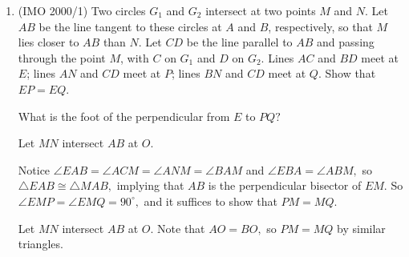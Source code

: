 \begin{enumerate}
    \item (IMO 2000/1) Two circles $G_1$ and $G_2$ intersect at two points $M$ and $N$. Let $AB$ be the line tangent to these circles at $A$ and $B$, respectively, so that $M$ lies closer to $AB$ than $N$. Let $CD$ be the line parallel to $AB$ and passing through the point $M$, with $C$ on $G_1$ and $D$ on $G_2$. Lines $AC$ and $BD$ meet at $E$; lines $AN$ and $CD$ meet at $P$; lines $BN$ and $CD$ meet at $Q$. Show that $EP=EQ$.
\begin{hint}
\begin{addhint}
{What is the foot of the perpendicular from $E$ to $PQ?$}
\end{addhint}
\begin{addhint}
{Let $MN$ intersect $AB$ at $O.$}
\end{addhint}
\end{hint}
\begin{solu}
\begin{addsol}
{Notice $\angle EAB=\angle ACM=\angle ANM=\angle BAM$ and $\angle EBA=\angle ABM,$ so $\triangle EAB\cong \triangle MAB,$ implying that $AB$ is the perpendicular bisector of $EM.$ So $\angle EMP=\angle EMQ=90^{\circ},$ and it suffices to show that $PM=MQ.$

Let $MN$ intersect $AB$ at $O.$ Note that $AO=BO,$ so $PM=MQ$ by similar triangles.}
\end{addsol}
\end{solu}

\end{enumerate}